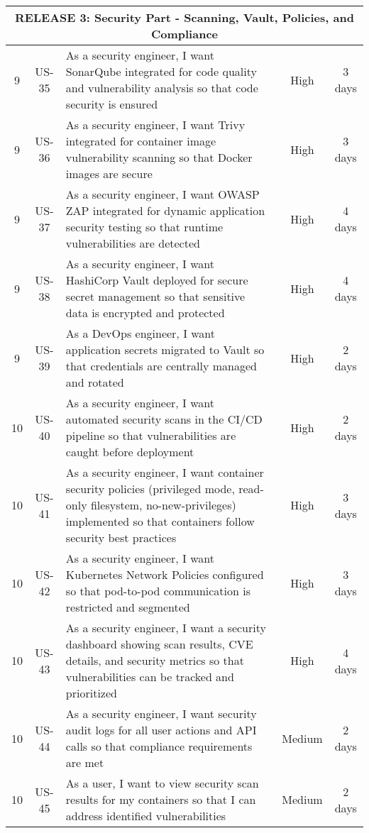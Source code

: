 \begin{longtable}{|c|c|p{7cm}|c|c|}
\multicolumn{5}{|c|}{\cellcolor{red!25}\textbf{RELEASE 3: Security Part - Scanning, Vault, Policies, and Compliance}} \\
\hline

9 & US-35 & As a security engineer, I want SonarQube integrated for code quality and vulnerability analysis so that code security is ensured & High & 3 days \\ \hline
9 & US-36 & As a security engineer, I want Trivy integrated for container image vulnerability scanning so that Docker images are secure & High & 3 days \\ \hline
9 & US-37 & As a security engineer, I want OWASP ZAP integrated for dynamic application security testing so that runtime vulnerabilities are detected & High & 4 days \\ \hline
9 & US-38 & As a security engineer, I want HashiCorp Vault deployed for secure secret management so that sensitive data is encrypted and protected & High & 4 days \\ \hline
9 & US-39 & As a DevOps engineer, I want application secrets migrated to Vault so that credentials are centrally managed and rotated & High & 2 days \\ \hline

10 & US-40 & As a security engineer, I want automated security scans in the CI/CD pipeline so that vulnerabilities are caught before deployment & High & 2 days \\ \hline
10 & US-41 & As a security engineer, I want container security policies (privileged mode, read-only filesystem, no-new-privileges) implemented so that containers follow security best practices & High & 3 days \\ \hline
10 & US-42 & As a security engineer, I want Kubernetes Network Policies configured so that pod-to-pod communication is restricted and segmented & High & 3 days \\ \hline
10 & US-43 & As a security engineer, I want a security dashboard showing scan results, CVE details, and security metrics so that vulnerabilities can be tracked and prioritized & High & 4 days \\ \hline
10 & US-44 & As a security engineer, I want security audit logs for all user actions and API calls so that compliance requirements are met & Medium & 2 days \\ \hline
10 & US-45 & As a user, I want to view security scan results for my containers so that I can address identified vulnerabilities & Medium & 2 days \\ \hline

\end{longtable}



